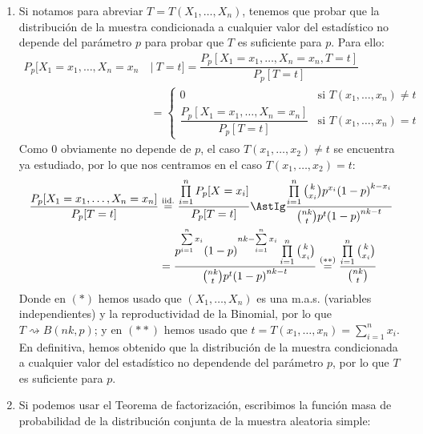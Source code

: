 \begin{ejercicio}
    \begin{enumerate}[label=\alph*)]
        \item Si notamos para abreviar $T=T(X_1, \ldots, X_n)$, tenemos que probar que la distribución de la muestra condicionada a cualquier valor del estadístico no depende del parámetro $p$ para probar que $T$ es suficiente para $p$. Para ello:
            \begin{align*}
                P_p[X_1 = x_1, \ldots, X_n = x_n \ &|\ T=t] = \dfrac{P_p[X_1=x_1, \ldots, X_n = x_n, T=t]}{P_p[T=t]} \\
                                                           &= \left\{\begin{array}{ll}
                                                               0 & \text{si\ } T(x_1,\ldots,x_n)\neq t \\
                                                               \dfrac{P_p[X_1=x_1, \ldots, X_n=x_n]}{P_p[T=t]}& \text{si\ } T(x_1,\ldots,x_n) = t
                                                           \end{array}\right. 
            \end{align*}
            Como $0$ obviamente no depende de $p$, el caso $T(x_1,\ldots,x_2)\neq t$ se encuentra ya estudiado, por lo que nos centramos en el caso $T(x_1,\ldots,x_2)=t$:
            \begin{align*}
                \dfrac{P_p[X_1=x_1, \ldots, X_n = x_n]}{P_p[T=t]} &\stackrel{\text{iid.}}{=} \dfrac{\prod\limits_{i=1}^{n}P_p[X=x_i]}{P_p[T=t]} \AstIg \dfrac{\prod\limits_{i=1}^n \binom{k}{x_i} p^{x_i} {(1-p)}^{k-x_i}}{\binom{nk}{t}p^t{(1-p)}^{nk-t}} \\
                                                                  &= \dfrac{p^{\sum\limits_{i=1}^n x_i} {(1-p)}^{nk - \sum\limits_{i=1}^n x_i}\prod\limits_{i=1}^n \binom{k}{x_i}}{\binom{nk}{t}p^t{(1-p)}^{nk-t}} \stackrel{(\ast\ast)}{=} \dfrac{\prod\limits_{i=1}^{n}\binom{k}{x_i}}{\binom{nk}{t}}
            \end{align*}
            Donde en $(\ast)$ hemos usado que $(X_1, \ldots, X_n)$ es una m.a.s. (variables independientes) y la reproductividad de la Binomial, por lo que $T\rightsquigarrow B(nk,p)$; y en $(\ast\ast)$ hemos usado que $t=T(x_1, \ldots, x_n) = \sum\limits_{i=1}^{n}x_i$. En definitiva, hemos obtenido que la distribución de la muestra condicionada a cualquier valor del estadístico no dependende del parámetro $p$, por lo que $T$ es suficiente para $p$.
        \item Si podemos usar el Teorema de factorización, escribimos la función masa de probabilidad de la distribución conjunta de la muestra aleatoria simple:

\end{enumerate}
\end{ejercicio}
